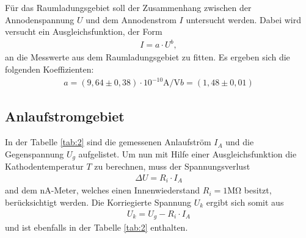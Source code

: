 Für das Raumladungsgebiet soll der Zusammenhang
zwischen der Annodenspannung $U$ und dem Annodenstrom $I$ untersucht
werden.
Dabei wird versucht ein Ausgleichsfunktion, der Form
\begin{align}
  I=a\cdot U^{b},
\end{align}
an die Messwerte aus dem Raumladungsgebiet zu fitten.
Es ergeben sich die folgenden Koeffizienten:
\begin{align*}
a=(9,64\pm0,38)\cdot10^{-10}\si{\ampere\per\volt}
b=(1,48\pm0,01)
\end{align*}




\subsection{Anlaufstromgebiet}
In der Tabelle \ref{tab:2} sind die gemessenen Anlaufström $I_A$
und die Gegenspannung $U_g$ aufgelistet.
Um nun mit Hilfe einer Ausgleichsfunktion die Kathodentemperatur $T$
zu berechnen, muss der Spannungsverlust
\begin{align*}
  \Delta U=R_i\cdot I_A
\end{align*}
and dem nA-Meter, welches einen Innenwiederstand $R_i=1\si{\mega\ohm}$ besitzt,
berücksichtigt werden.
Die Korriegierte Spannung $U_k$ ergibt sich somit aus
\begin{align}
U_k=U_g-R_i\cdot I_A \label{eqn:U_k}
\end{align}
und ist ebenfalls in der Tabelle \ref{tab:2} enthalten.

